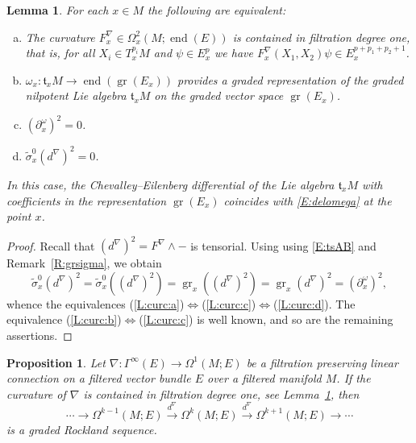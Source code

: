 \documentclass[reqno,12pt]{amsart}
\DeclareMathOperator{\gr}{gr}
\DeclareMathOperator{\eend}{end}
\newcommand\itemref[1]{(\ref{#1})}
\theoremstyle{plain}
\newtheorem{lemma}[theorem]{Lemma}
\newtheorem{proposition}[theorem]{Proposition}
\theoremstyle{definition}
\begin{document}
\begin{lemma}\label{L:curv}
For each $x\in M$ the following are equivalent:
\begin{enumerate}[(a)]
\item\label{L:curc:a} The curvature $F^\nabla_x\in\Omega_x^2(M;\eend(E))$ is contained in filtration degree one, that is, for all $X_i\in T_x^{p_i}M$ and $\psi\in E^p_x$ we have $F_x^\nabla(X_1,X_2)\psi\in E^{p+p_1+p_2+1}_x$.
\item\label{L:curc:b} $\omega_x\colon\mathfrak t_xM\to\eend(\gr(E_x))$ provides a graded representation of the graded nilpotent Lie algebra $\mathfrak t_xM$ on the graded vector space $\gr(E_x)$.
\item\label{L:curc:c} $(\partial_x^\omega)^2=0$.
\item\label{L:curc:d} $\tilde\sigma^0_x(d^\nabla)^2=0$.
\end{enumerate}
In this case, the Chevalley--Eilenberg differential of the Lie algebra $\mathfrak t_xM$ with coefficients in the representation $\gr(E_x)$ coincides with \eqref{E:delomega} at the point $x$.
\end{lemma}


\begin{proof}
Recall that $(d^\nabla)^2=F^\nabla\wedge-$ is tensorial.
Using using \eqref{E:tsAB} and Remark~\ref{R:grsigma}, we obtain
$$
\tilde\sigma^0_x(d^\nabla)^2
=\tilde\sigma_x^0((d^\nabla)^2)
=\gr_x((d^\nabla)^2)
=\gr_x(d^\nabla)^2
=(\partial_x^\omega)^2,
$$
whence the equivalences \itemref{L:curc:a}$\Leftrightarrow$\itemref{L:curc:c}$\Leftrightarrow$\itemref{L:curc:d}.
The equivalence \itemref{L:curc:b}$\Leftrightarrow$\itemref{L:curc:c} is well known, and so are the remaining assertions.
\end{proof}


\begin{proposition}\label{P:hypo}
Let $\nabla\colon\Gamma^\infty(E)\to\Omega^1(M;E)$ be a filtration preserving linear connection on a filtered vector bundle $E$ over a filtered manifold $M$.
If the curvature of $\nabla$ is contained in filtration degree one, see Lemma~\ref{L:curv}, then 
\begin{equation}\label{E:dnablak}
\cdots\to\Omega^{k-1}(M;E)\xrightarrow{d^\nabla}\Omega^k(M;E)
\xrightarrow{d^\nabla}\Omega^{k+1}(M;E)\to\cdots
\end{equation}
is a graded Rockland sequence.
\end{proposition}
\end{document}
